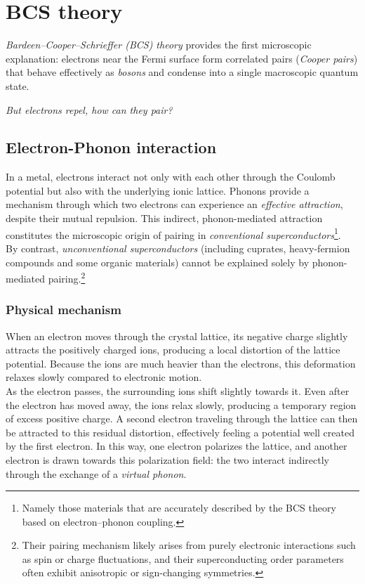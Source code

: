 \chapter{BCS theory}
\label{Ch_2}
\textit{Bardeen--Cooper--Schrieffer (BCS) theory} provides the first microscopic explanation: 
electrons near the Fermi surface form correlated pairs (\textit{Cooper pairs}) that behave effectively as \emph{bosons} and condense into a single macroscopic quantum state. 
\begin{center}
\textit{But electrons repel, how can they pair?}    
\end{center}


\section{Electron-Phonon interaction}
In a metal, electrons interact not only with each other through the Coulomb potential but also with the underlying ionic lattice.
Phonons provide a mechanism through which two electrons can experience an \textit{effective attraction}, despite their mutual repulsion.
This indirect, phonon-mediated attraction constitutes the microscopic origin of pairing in \textit{conventional superconductors}\footnote{Namely those materials that are accurately described by the BCS theory based on electron–phonon coupling.}.\\
By contrast, \emph{unconventional superconductors} (including cuprates, heavy-fermion compounds and some organic materials) cannot be explained solely by phonon-mediated pairing.\footnote{%
Their pairing mechanism likely arises from purely electronic interactions such as spin or charge fluctuations, and their superconducting order parameters often exhibit anisotropic or sign-changing symmetries.%
}

\subsection*{Physical mechanism}
When an electron moves through the crystal lattice, its negative charge slightly attracts the positively charged ions, producing a local distortion of the lattice potential.  
Because the ions are much heavier than the electrons, this deformation relaxes slowly compared to electronic motion.  \\
As the electron passes, the surrounding ions shift slightly towards it. Even after the electron has moved away, the ions relax slowly, producing a temporary region of excess positive charge.
A second electron traveling through the lattice can then be attracted to this residual distortion, effectively feeling a potential well created by the first electron.  
In this way, one electron polarizes the lattice, and another electron is drawn towards this polarization field: the two interact indirectly through the exchange of a \emph{virtual phonon}.  

